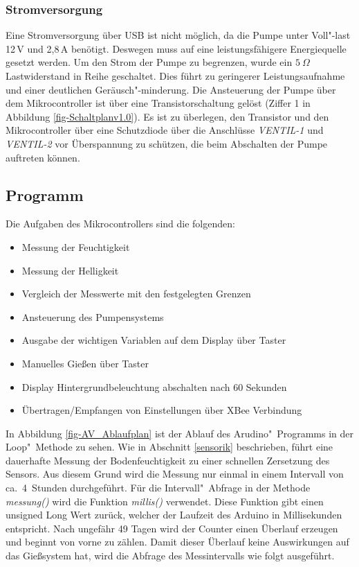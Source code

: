 	
\subsubsection{Stromversorgung}

Eine Stromversorgung über USB ist nicht möglich, da die Pumpe unter Voll"-last 12\,V und 2,8\,A benötigt. 
Deswegen muss auf eine leistungsfähigere Energiequelle gesetzt werden.
Um den Strom der Pumpe zu begrenzen, wurde ein \begin{math}5~\Omega\end{math}\,Lastwiderstand in Reihe geschaltet.
Dies führt zu geringerer Leistungsaufnahme und einer deutlichen Geräusch"-minderung.
Die Ansteuerung der Pumpe über dem Mikrocontroller ist über eine Transistorschaltung gelöst (Ziffer 1 in Abbildung \ref{fig-Schaltplanv1.0}).
Es ist zu überlegen, den Transistor und den Mikrocontroller über eine Schutzdiode über die Anschlüsse \emph{VENTIL-1} und \emph{VENTIL-2} vor Überspannung zu schützen, die beim Abschalten der Pumpe auftreten können. 
 

\subsection{Programm}
	

	Die Aufgaben des Mikrocontrollers sind die folgenden:
		\begin{itemize}
			\item Messung der Feuchtigkeit
			\item Messung der Helligkeit
			\item Vergleich der Messwerte mit den festgelegten Grenzen
			\item Ansteuerung des Pumpensystems
			\item Ausgabe der wichtigen Variablen auf dem Display über Taster
			\item Manuelles Gießen über Taster
			\item Display Hintergrundbeleuchtung abschalten nach 60 Sekunden
			\item Übertragen/Empfangen von Einstellungen über XBee Verbindung
		\end{itemize}
		
	

	
In Abbildung \ref{fig-AV_Ablaufplan} ist der Ablauf des Arudino"~Programms in der Loop"~Methode zu sehen.
Wie in Abschnitt \ref{sensorik} beschrieben, führt eine dauerhafte Messung der Bodenfeuchtigkeit zu einer schnellen Zersetzung des Sensors.
Aus diesem Grund wird die Messung nur einmal in einem Intervall von ca.~4~Stunden durchgeführt. Für die Intervall"~Abfrage in der Methode \emph{messung()} wird die Funktion \emph{millis()} verwendet. Diese Funktion gibt einen unsigned Long Wert zurück, welcher der Laufzeit des Arduino in Millisekunden entspricht. Nach ungefähr 49 Tagen wird der Counter einen Überlauf erzeugen und beginnt von vorne zu zählen. Damit dieser Überlauf keine Auswirkungen auf das Gießsystem hat, wird die Abfrage des Messintervalls wie folgt ausgeführt.

